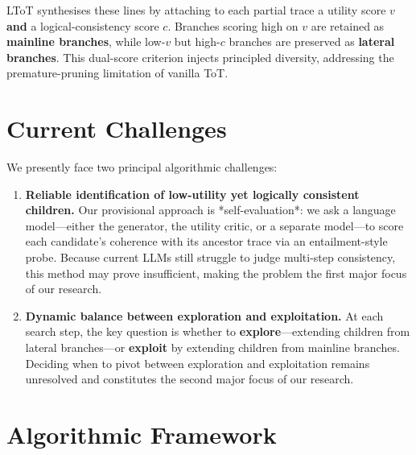 \documentclass[onecolumn]{IEEEtran}
\begin{document}
LToT synthesises these lines by attaching to each partial trace a utility score $v$ \textbf{and} a logical-consistency score $c$.
Branches scoring high on $v$ are retained as \textbf{mainline branches}, while low-$v$ but high-$c$ branches are preserved as \textbf{lateral branches}.
This dual-score criterion injects principled diversity, addressing the premature-pruning limitation of vanilla ToT.


\section{Current Challenges}
\label{section:current-challenges}

We presently face two principal algorithmic challenges:

\begin{enumerate}
   \item
      \textbf{Reliable identification of low-utility yet logically consistent children.}
      Our provisional approach is *self-evaluation*: we ask a language model—either the generator, the utility critic, or a separate model—to score each candidate's coherence with its ancestor trace via an entailment-style probe.
      Because current LLMs still struggle to judge multi-step consistency, this method may prove insufficient, making the problem the first major focus of our research.
   \item
      \textbf{Dynamic balance between exploration and exploitation.}
      At each search step, the key question is whether to \textbf{explore}---extending children from lateral branches---or \textbf{exploit} by extending children from mainline branches.
      Deciding when to pivot between exploration and exploitation remains unresolved and constitutes the second major focus of our research.
\end{enumerate}


\section{Algorithmic Framework}
\label{section:algorithmic-framework}
\end{document}
